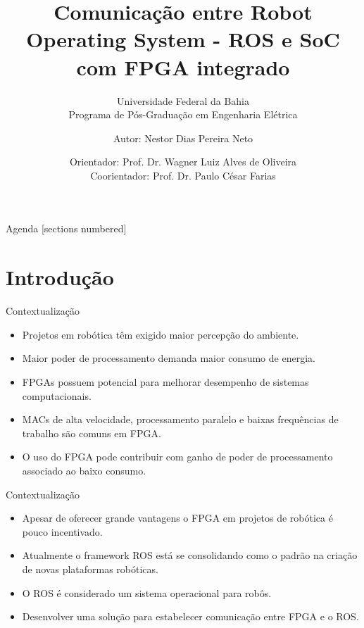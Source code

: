\documentclass[10pt]{beamer}
\title{Comunicação entre Robot Operating System - ROS e SoC com FPGA integrado}
\subtitle{Universidade Federal da Bahia\\
            Programa de Pós-Graduação em Engenharia Elétrica}
\date{Orientador: Prof. Dr. Wagner Luiz Alves de Oliveira\\Coorientador: Prof. Dr. Paulo César Farias}
\author{Autor: Nestor Dias Pereira Neto}
\institute{Salvador, 6 de dezembro de 2022}
\begin{document}
\maketitle

\begin{frame}{Agenda}
  [sections numbered]
  \tableofcontents[hideallsubsections]
\end{frame}


\section{Introdução}

\begin{frame}{Contextualização}
	\begin{alertblock}{}
    	\begin{itemize}
		\setlength\itemsep{0.7em}
    	\item Projetos em robótica têm exigido maior percepção do ambiente.
    	\item Maior poder de processamento demanda maior consumo de energia.
    	\item FPGAs possuem potencial para melhorar desempenho de sistemas computacionais.
    	\item MACs de alta velocidade, processamento paralelo e baixas frequências de trabalho são comuns em FPGA. 
    	\item O uso do FPGA pode contribuir com ganho de poder de processamento associado ao baixo consumo.
    	\end{itemize}
    \end{alertblock}
 \nocite{LwIP,freertosbook,ROSeffect,PDSfpga,NiosIIbook,ROSfpga}
\end{frame}

\begin{frame}{Contextualização}
	\begin{alertblock}{}
    	\begin{itemize}%
		\setlength\itemsep{1em}
		\item Apesar de oferecer grande vantagens o FPGA em projetos de robótica é pouco incentivado.
    	\item Atualmente o framework ROS está se consolidando como o padrão na criação de novas plataformas robóticas.
    	\item O ROS é considerado um sistema operacional para robôs.
    	\item Desenvolver uma solução para estabelecer comunicação entre FPGA e o ROS.
    	\end{itemize}
    \end{alertblock}
 \nocite{LwIP,freertosbook,ROSeffect,PDSfpga,NiosIIbook,ROSfpga}
\end{frame}
\end{document}
